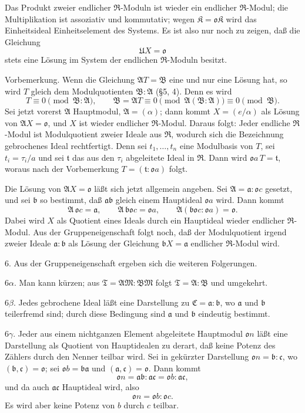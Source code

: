 \documentclass[11pt]{article}
\providecommand{\mR}{\mathfrak{R}}
\providecommand{\mK}{\mathfrak{K}}
\providecommand{\ma}{\mathfrak{a}}
\providecommand{\mb}{\mathfrak{b}}
\providecommand{\mc}{\mathfrak{c}}
\providecommand{\mo}{\mathfrak{o}}
\providecommand{\mt}{\mathfrak{t}}
\begin{document}
Das Produkt zweier endlicher $\mR$-Moduln ist wieder ein endlicher $\mR$-Modul; die Multiplikation ist assoziativ und kommutativ; wegen $\mK=\mo\mK$ wird das Einheitsideal Einheitselement des Systems. Es ist also nur noch zu zeigen, daß die Gleichung
\[
        \mathfrak U X=\mo
\]
stets eine Lösung im System der endlichen $\mR$-Moduln besitzt.

Vorbemerkung. Wenn die Gleichung $\mathfrak A T=\mathfrak B$ eine und nur eine Lösung hat, so wird $T$ gleich dem Modulquotienten $\mathfrak B:\mathfrak A$ (§5, 4). Denn es wird
\[
        T\equiv0\pmod{\mathfrak B:\mathfrak A},
        \qquad
        \mathfrak B=\mathfrak A T\equiv0\pmod{\mathfrak A(\mathfrak B:\mathfrak A)}\equiv0\pmod{\mathfrak B}.
\]
Sei jetzt vorerst $\mathfrak A$ Hauptmodul, $\mathfrak A=(\alpha)$; dann kommt $X=(e/\alpha)$ als Lösung von $\mathfrak A X=\mo$, und $X$ ist wieder endlicher $\mR$-Modul. Daraus folgt: Jeder endliche $\mR$-Modul ist Modulquotient zweier Ideale aus $\mR$, wodurch sich die Bezeichnung gebrochenes Ideal rechtfertigt. Denn sei $t_1,\ldots,t_n$ eine Modulbasis von $T$, sei $t_i=\tau_i/a$ und sei $\mt$ das aus den $\tau_i$ abgeleitete Ideal in $\mR$. Dann wird $\mo a\,T=\mt$, woraus nach der Vorbemerkung $T=(\mt:\mo a)$ folgt.

Die Lösung von $\mathfrak A X=\mo$ läßt sich jetzt allgemein angeben. Sei $\mathfrak A=\ma:\mo c$ gesetzt, und sei $\mb$ so bestimmt, daß $\ma\mb$ gleich einem Hauptideal $\mo a$ wird. Dann kommt
\[
        \mathfrak A\,\mo c=\ma,
        \qquad \mathfrak A\,\mb\mo c=\mo a,
        \qquad \mathfrak A(\mb\mo c:\mo a)=\mo.
\]
Dabei wird $X$ als Quotient eines Ideals durch ein Hauptideal wieder endlicher $\mR$-Modul. Aus der Gruppeneigenschaft folgt noch, daß der Modulquotient irgend zweier Ideale $\ma:\mb$ als Lösung der Gleichung $\mb X=\ma$ endlicher $\mR$-Modul wird.

6. Aus der Gruppeneigenschaft ergeben sich die weiteren Folgerungen.

6$\alpha$. Man kann kürzen; aus $\mathfrak T=\mathfrak A\mathfrak M:\mathfrak B\mathfrak M$ folgt $\mathfrak T=\mathfrak A:\mathfrak B$ und umgekehrt.

6$\beta$. Jedes gebrochene Ideal läßt eine Darstellung zu $\mathfrak C=\ma:\mb$, wo $\ma$ und $\mb$ teilerfremd sind; durch diese Bedingung sind $\ma$ und $\mb$ eindeutig bestimmt.

6$\gamma$. Jeder aus einem nichtganzen Element abgeleitete Hauptmodul $\mo n$ läßt eine Darstellung als Quotient von Hauptidealen zu derart, daß keine Potenz des Zählers durch den Nenner teilbar wird. Sei in gekürzter Darstellung $\mo n=\mb:\mc$, wo $(\mb,\mc)=\mo$; sei $\mo b=\mb\ma$ und $(\ma,\mc)=\mo$. Dann kommt
\[
        \mo n=\ma\mb:\ma\mc=\mo b:\ma\mc,
\]
und da auch $\ma\mc$ Hauptideal wird, also
\[
        \mo n=\mo b:\mo c.
\]
Es wird aber keine Potenz von $b$ durch $c$ teilbar.
\end{document}
